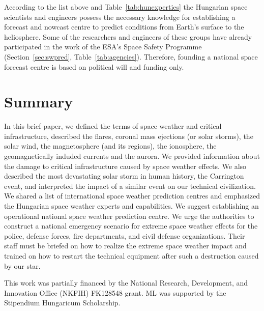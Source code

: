 \documentclass[sn-aps]{sn-jnl}%
\begin{document}
According to the list above and Table~\ref{tab:hunexperties} the Hungarian space scientists and engineers possess the necessary knowledge for establishing a forecast and nowcast centre to predict conditions from Earth's surface to the heliosphere. Some of the researchers and engineers of these groups have already participated in the work of the ESA's Space Safety Programme (Section~\ref{sec:swpred}, Table~\ref{tab:agencies}). Therefore, founding a national space forecast centre is based on political will and funding only. 

\section{Summary}
\label{sec:sum}

In this brief paper, we defined the terms of space weather and critical infrastructure, described the flares, coronal mass ejections (or solar storms), the solar wind, the magnetosphere (and its regions), the ionosphere, the geomagnetically induded currents and the aurora. We provided information about the damage to critical infrastructure caused by space weather effects. We also described the most devastating solar storm in human history, the Carrington event, and interpreted the impact of a similar event on our technical civilization. We shared a list of international space weather prediction centres and emphasized the Hungarian space weather experts and capabilities. We suggest establishing an operational national space weather prediction centre. We urge the authorities to construct a national emergency scenario for extreme space weather effects for the police, defense forces, fire departments, and civil defense organizations. Their staff must be briefed on how to realize the extreme space weather impact and trained on how to restart the technical equipment after such a destruction caused by our star. 

\backmatter


This work was partially financed by the National Research, Development, and Innovation Office (NKFIH) FK128548 grant. ML was supported by the Stipendium Hungaricum Scholarship. 

\vfill


\pagebreak

%

\end{document}
